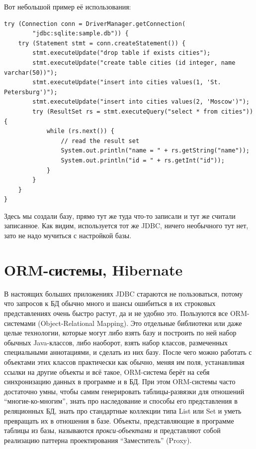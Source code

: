 \documentclass[a5paper]{article}
\begin{document}
Вот небольшой пример её использования:

\begin{verbatim}
try (Connection conn = DriverManager.getConnection(
        "jdbc:sqlite:sample.db")) {
    try (Statement stmt = conn.createStatement()) {
        stmt.executeUpdate("drop table if exists cities");
        stmt.executeUpdate("create table cities (id integer, name varchar(50))");
        stmt.executeUpdate("insert into cities values(1, 'St. Petersburg')");
        stmt.executeUpdate("insert into cities values(2, 'Moscow')");
        try (ResultSet rs = stmt.executeQuery("select * from cities")) {
            while (rs.next()) {
                // read the result set
                System.out.println("name = " + rs.getString("name"));
                System.out.println("id = " + rs.getInt("id"));
            }
        }
    }
}
\end{verbatim}

Здесь мы создали базу, прямо тут же туда что-то записали и тут же считали записанное. Как видим, используется тот же JDBC, ничего необычного тут нет, зато не надо мучиться с настройкой базы.

\section{ORM-системы, Hibernate}

В настоящих больших приложениях JDBC стараются не пользоваться, потому что запросов к БД обычно много и шансы ошибиться в их строковых представлениях очень быстро растут, да и не удобно это. Пользуются все ORM-системами (Object-Relational Mapping). Это отдельные библиотеки или даже целые технологии, которые могут либо взять базу и построить по ней набор обычных Java-классов, либо наоборот, взять набор классов, размеченных специальными аннотациями, и сделать из них базу. После чего можно работать с объектами этих классов практически как обычно, меняя им поля, устанавливая ссылки на другие объекты и всё такое, ORM-система берёт на себя синхронизацию данных в программе и в БД. При этом ORM-системы часто достаточно умны, чтобы самим генерировать таблицы-развязки для отношений ``многие-ко-многим'', знать про наследование и способы его представления в реляционных БД, знать про стандартные коллекции типа List или Set и уметь превращать их в отношения в базе. Объекты, представляющие в программе таблицы из базы, называются \textit{прокси-объектами} и представляют собой реализацию паттерна проектирования ``Заместитель'' (Proxy).
\end{document}
